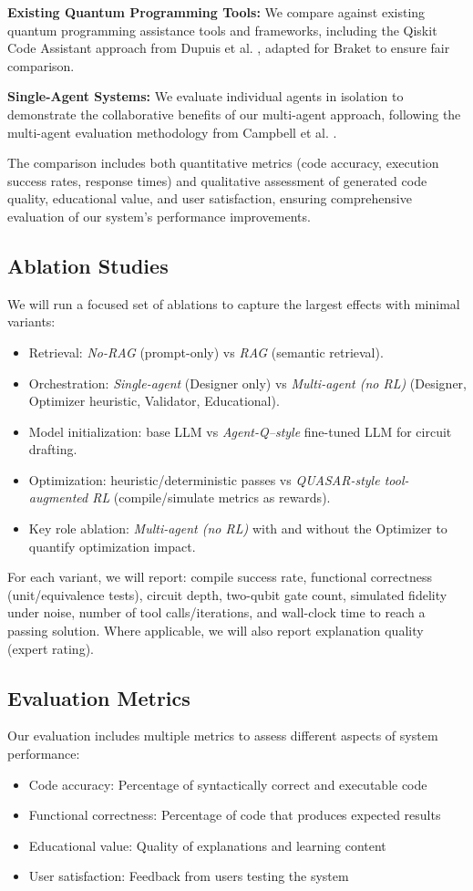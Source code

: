 \documentclass[runningheads]{llncs}
\begin{document}
\textbf{Existing Quantum Programming Tools:} We compare against existing quantum programming assistance tools and frameworks, including the Qiskit Code Assistant approach from Dupuis et al. \cite{10691762}, adapted for Braket to ensure fair comparison.

\textbf{Single-Agent Systems:} We evaluate individual agents in isolation to demonstrate the collaborative benefits of our multi-agent approach, following the multi-agent evaluation methodology from Campbell et al. \cite{campbell2025enhancingllmbasedquantumcode}.

The comparison includes both quantitative metrics (code accuracy, execution success rates, response times) and qualitative assessment of generated code quality, educational value, and user satisfaction, ensuring comprehensive evaluation of our system's performance improvements.

\subsection{Ablation Studies}
We will run a focused set of ablations to capture the largest effects with minimal variants:
\begin{itemize}
\item Retrieval: \textit{No-RAG} (prompt-only) vs \textit{RAG} (semantic retrieval).
\item Orchestration: \textit{Single-agent} (Designer only) vs \textit{Multi-agent (no RL)} (Designer, Optimizer heuristic, Validator, Educational).
\item Model initialization: base LLM vs \textit{Agent-Q–style} fine-tuned LLM for circuit drafting.
\item Optimization: heuristic/deterministic passes vs \textit{QUASAR-style tool-augmented RL} (compile/simulate metrics as rewards).
\item Key role ablation: \textit{Multi-agent (no RL)} with and without the Optimizer to quantify optimization impact.
\end{itemize}

For each variant, we will report: compile success rate, functional correctness (unit/equivalence tests), circuit depth, two-qubit gate count, simulated fidelity under noise, number of tool calls/iterations, and wall-clock time to reach a passing solution. Where applicable, we will also report explanation quality (expert rating).

\subsection{Evaluation Metrics}
Our evaluation includes multiple metrics to assess different aspects of system performance:
\begin{itemize}
\item Code accuracy: Percentage of syntactically correct and executable code
\item Functional correctness: Percentage of code that produces expected results
\item Educational value: Quality of explanations and learning content
\item User satisfaction: Feedback from users testing the system
\end{itemize}
\end{document}
